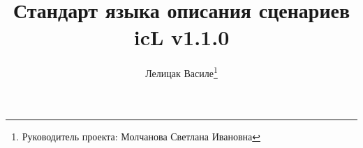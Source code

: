 \documentclass[a4paper, 14pt]{extarticle}
\begin{document}



\title{Стандарт языка описания сценариев icL v1.1.0}
\author{Лелицак Василе\thanks{Руководитель проекта: Молчанова Светлана Ивановна}}

\clearpage\maketitle
\thispagestyle{empty}

\newpage
\renewcommand{\contentsname}{\textsf{Оглавление}}\makeatletter
\renewcommand{\l@section}{\@dottedtocline{1}{1.5em}{2.6em}}
\renewcommand{\l@subsection}{\@dottedtocline{2}{4.0em}{3.6em}}
\renewcommand{\l@subsubsection}{\@dottedtocline{3}{7.4em}{4.5em}}
\makeatother
\tableofcontents
\end{document}
